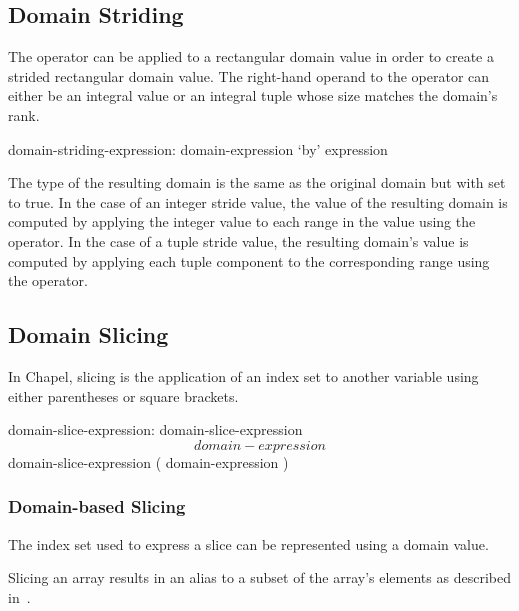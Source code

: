 \subsection{Domain Striding}
\label{Domain_Striding}

The  operator can be applied to a rectangular domain value in
order to create a strided rectangular domain value.  The right-hand
operand to the  operator can either be an integral value or
an integral tuple whose size matches the domain's rank.

\begin{syntax}
domain-striding-expression:
  domain-expression `by' expression
\end{syntax}

The type of the resulting domain is the same as the original domain
but with  set to true.  In the case of an integer
stride value, the value of the resulting domain is computed by
applying the integer value to each range in the value using the
 operator.  In the case of a tuple stride value, the resulting
domain's value is computed by applying each tuple component to the
corresponding range using the  operator.


\subsection{Domain Slicing}
\label{Domain_Slicing}

In Chapel, slicing is the application of an index set to another
variable using either parentheses or square brackets.

\begin{syntax}
domain-slice-expression:
  domain-slice-expression \[ domain-expression \]
  domain-slice-expression ( domain-expression )
\end{syntax}

\subsubsection{Domain-based Slicing}

The index set used to express a slice can be represented using a
domain value.

Slicing an array results in an alias to a subset of the array's
elements as described in~.

